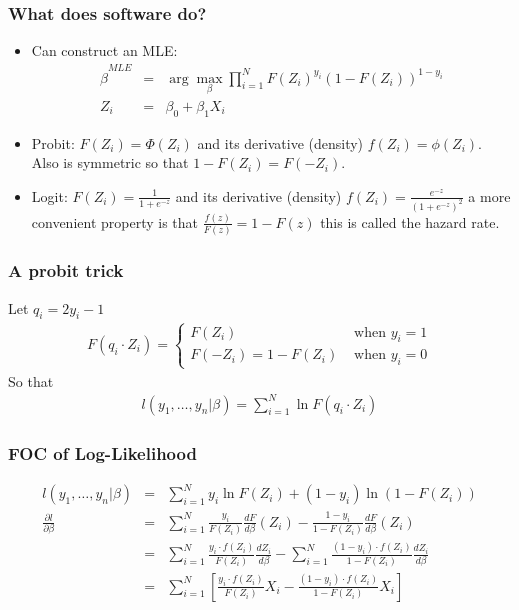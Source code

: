 \documentclass[aspectratio=169]{beamer}
\begin{document}
\begin{frame}
\frametitle{What does software do?}
\begin{itemize}
\item Can construct an MLE:
\begin{eqnarray*}
\hat{\beta}^{MLE} &=& \arg \max_{\beta} \prod_{i=1}^N F(Z_i)^{y_i} (1-F(Z_i))^{1-{y_i} }\\
Z_i &=& \beta_0 + \beta_1 X_i
\end{eqnarray*}
\item Probit: $F(Z_i) = \Phi(Z_i)$ and its derivative (density) $f(Z_i) = \phi(Z_i)$. \\
Also is \alert{symmetric} so that $1 - F(Z_i) = F(-Z_i)$.
\item Logit: $F(Z_i) = \frac{1}{1+e^{-z}}$ and its derivative (density) $f(Z_i) = \frac{e^{-z}}{(1+e^{-z})^2}$ a more convenient property is that $\frac{f(z)}{F(z)} = 1 - F(z)$ this is called the \alert{hazard rate}.
\end{itemize}
\end{frame}

\begin{frame}
\frametitle{A probit trick}
Let $q_i = 2 y_i -1$
\begin{eqnarray*}
F(q_i \cdot Z_i) = 
\begin{cases}
F(Z_i)  &\mbox{ when } y_i=1 \\
F(-Z_i) = 1-F(Z_i)& \mbox{ when } y_i=0
\end{cases}
\end{eqnarray*}
So that 
\begin{eqnarray*}
l(y_1,\ldots, y_n | \beta) = \sum_{i=1}^N \ln F(q_i \cdot Z_i) 
\end{eqnarray*}
\end{frame}


\begin{frame}
\frametitle{FOC of Log-Likelihood}
\begin{eqnarray*}
l(y_1,\ldots,y_n | \beta) &=& \sum_{i=1}^N y_i \ln F(Z_i) + (1-y_i) \ln(1- F(Z_i)) \\
\frac{\partial l }{\partial \beta} &=& \sum_{i=1}^N \frac{y_i}{ F(Z_i)} \frac{ d F}{d \beta}(Z_i) - \frac{1-y_i}{1-F(Z_i)}  \frac{ d F}{d \beta} (Z_i)\\
 &=& \sum_{i=1}^N \frac{y_i \cdot f(Z_i) }{ F(Z_i)} \frac{ d Z_i}{d \beta} -  \sum_{i=1}^N \frac{(1-y_i)\cdot f(Z_i) }{1-F(Z_i)} \frac{ d Z_i}{d \beta} \\
 &=& \sum_{i=1}^N  \left[ \frac{y_i \cdot f(Z_i) }{ F(Z_i)} X_i -  \frac{(1-y_i)\cdot f(Z_i) }{1-F(Z_i)} X_i \right] \\
\end{eqnarray*}
\end{frame}
\end{document}
